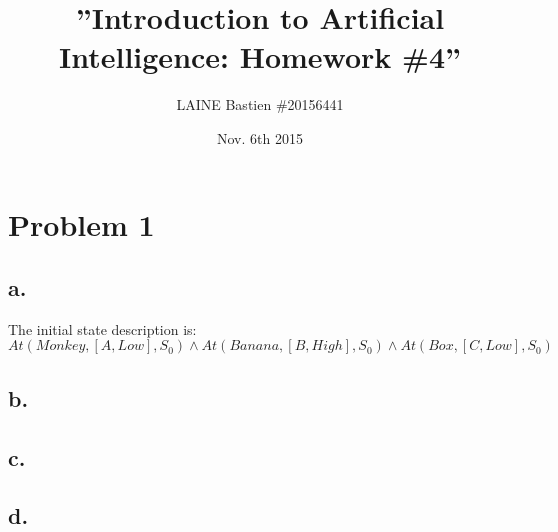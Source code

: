 \documentclass{article}
\begin{document}
    \title{\textbf{''Introduction to Artificial Intelligence: Homework \#4''}}
    \author{LAINE Bastien \#20156441}
    \date{Nov. 6th 2015}
    \maketitle
    \tableofcontents

    \newpage

    \section{Problem 1}
        \subsection{a.}
            The initial state description is:\\
            $At(Monkey,[A,Low],S_0)\land At(Banana,[B,High],S_0)\land At(Box,[C,Low],S_0)$
        \subsection{b.}
        \subsection{c.}
        \subsection{d.}
\end{document}
